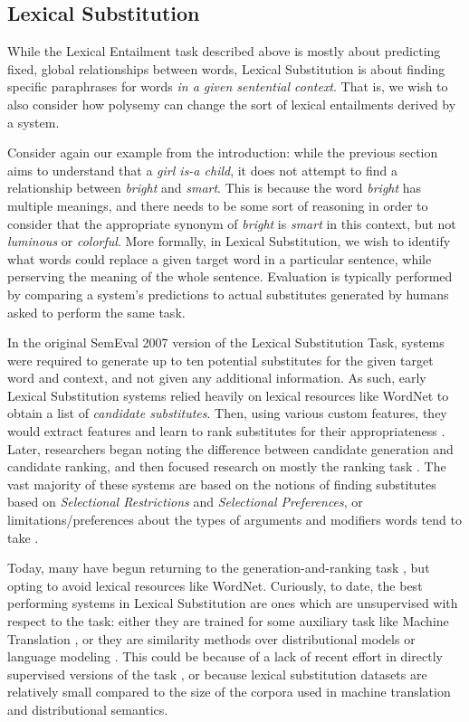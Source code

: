 \documentclass[12pt]{article}
\begin{document}
\subsection{Lexical Substitution}
\label{sec:lexsub}

While the Lexical Entailment task described above is mostly about predicting
fixed, global relationships between words, Lexical Substitution is about
finding specific paraphrases for words {\em in a given sentential context}.
That is, we wish to also consider how polysemy can change the sort of
lexical entailments derived by a system.

Consider again our example from the introduction: while the previous section
aims to understand that a {\em girl is-a child}, it does not attempt to find a
relationship between {\em bright} and {\em smart}. This is because the word
{\em bright} has multiple meanings, and there needs to be some sort of
reasoning in order to consider that the appropriate synonym of {\em bright}
is {\em smart} in this context, but not {\em luminous} or {\em colorful}.
More formally, in Lexical Substitution, we wish to identify what
words could replace a given target word in a particular sentence, while
perserving the meaning of the whole sentence. Evaluation is typically
performed by comparing a system's predictions to actual substitutes generated
by humans asked to perform the same task.

In the original SemEval 2007 version of the Lexical Substitution Task, systems
were required to generate up to ten potential substitutes for the given target
word and context, and not given any additional information. As such, early
Lexical Substitution systems relied heavily on lexical resources like WordNet
to obtain a list of {\em candidate substitutes}. Then, using various custom
features, they would extract features and learn to rank substitutes for their
appropriateness \cite{mccarthy:2007:semeval}. Later, researchers began noting
the difference between candidate generation and candidate ranking, and then
focused research on mostly the ranking task \cite{needcite}. The vast majority
of these systems are based on the notions of finding substitutes based on {\em
Selectional Restrictions} and {\em Selectional Preferences}, or
limitations/preferences about the types of arguments and modifiers words tend
to take \cite{needcite}.

Today, many have begun returning to the generation-and-ranking task
\cite{melamud:2015:naacl,kawakami:2016:iclr,roller:2016:naacl,melamud:2016:conll},
but opting to avoid lexical resources like WordNet.  Curiously, to date, the
best performing systems in Lexical Substitution are ones which are unsupervised
with respect to the task: either they are trained for some auxiliary task like
Machine Translation \cite{kawakami:2016:iclr}, or they are similarity methods
over distributional models \cite{roller:2016:naacl} or language modeling
\cite{melamud:2015:naacl}. This could be because of a lack of recent effort in
directly supervised versions of the task \cite{szarvas:2013:naacl}, or because
lexical substitution datasets are relatively small compared to the size of the
corpora used in machine translation and distributional semantics.
\end{document}
